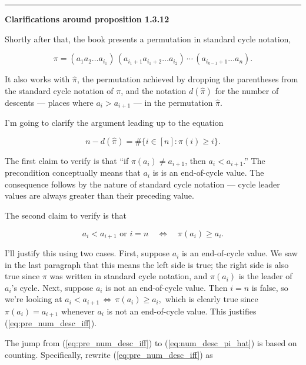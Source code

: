 \documentclass[]{article}
\begin{document}
\begin{center}\rule{0.5\linewidth}{\linethickness}\end{center}

\textbf{Clarifications around proposition 1.3.12}

Shortly after that, the book presents a permutation in standard cycle
notation,

\[\pi = (a_1 a_2 \ldots a_{i_1}) \,
        (a_{i_1+1} a_{i_1+2} \ldots a_{i_2}) \, \cdots \,
        (a_{i_{k-1}+1} \ldots a_n).\]

It also works with \(\hat\pi\), the permutation achieved by dropping the
parentheses from the standard cycle notation of \(\pi\), and the
notation \(d(\hat\pi)\) for the number of descents --- places where
\(a_i > a_{i+1}\) --- in the permutation \(\hat\pi\).

I'm going to clarify the argument leading up to the equation

\begin{equation}n-d(\hat\pi) = \#\{i\in[n]:\pi(i)\ge i\}.\label{eq:num_desc_pi_hat}\end{equation}

The first claim to verify is that ``if \(\pi(a_i)\ne a_{i+1}\), then
\(a_i<a_{i+1}\).'' The precondition conceptually means that \(a_i\) is
is an end-of-cycle value. The consequence follows by the nature of
standard cycle notation --- cycle leader values are always greater than
their preceding value.

The second claim to verify is that

\begin{equation}a_i<a_{i+1}\text{ or }i=n \quad\Leftrightarrow\quad \pi(a_i)\ge a_i.\label{eq:pre_num_desc_iff}\end{equation}

I'll justify this using two cases. First, suppose \(a_i\) is an
end-of-cycle value. We saw in the last paragraph that this means the
left side is true; the right side is also true since \(\pi\) was written
in standard cycle notation, and \(\pi(a_i)\) is the leader of \(a_i\)'s
cycle. Next, suppose \(a_i\) is not an end-of-cycle value. Then \(i=n\)
is false, so we're looking at
\(a_i<a_{i+1}\,\Leftrightarrow\,\pi(a_i)\ge a_i,\) which is clearly true
since \(\pi(a_i) = a_{i+1}\) whenever \(a_i\) is not an end-of-cycle
value. This justifies (\ref{eq:pre_num_desc_iff}).

The jump from (\ref{eq:pre_num_desc_iff}) to (\ref{eq:num_desc_pi_hat})
is based on counting. Specifically, rewrite (\ref{eq:pre_num_desc_iff})
as
\end{document}
